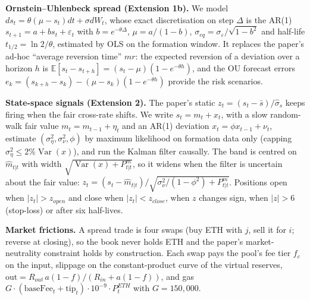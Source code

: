 \documentclass[10pt,a4paper]{article}
\begin{document}
\textbf{Ornstein--Uhlenbeck spread (Extension 1b).} We model $ds_t=\theta(\mu-s_t)dt+\sigma dW_t$, whose exact discretisation on step $\Delta$ is the AR(1) $s_{t+1}=a+bs_t+\varepsilon_t$ with $b=e^{-\theta\Delta}$, $\mu=a/(1-b)$, $\sigma_{eq}=\sigma_\varepsilon/\sqrt{1-b^2}$ and half-life $t_{1/2}=\ln 2/\theta$, estimated by OLS on the formation window. It replaces the paper's ad-hoc ``average reversion time'' $mr$: the expected reversion of a deviation over a horizon $h$ is $\mathbb{E}[s_t-s_{t+h}]=(s_t-\mu)(1-e^{-\theta h})$, and the OU forecast errors $e_k=(s_{k+h}-s_k)-(\mu-s_k)(1-e^{-\theta h})$ provide the risk scenarios.

\textbf{State-space signals (Extension 2).} The paper's static $z_t=(s_t-\bar s)/\hat\sigma_s$ keeps firing when the fair cross-rate shifts. We write $s_t=m_t+x_t$, with a slow random-walk fair value $m_t=m_{t-1}+\eta_t$ and an AR(1) deviation $x_t=\phi x_{t-1}+\nu_t$, estimate $(\sigma^2_\eta,\sigma^2_\nu,\phi)$ by maximum likelihood on formation data only (capping $\sigma^2_\eta\le 2\%\operatorname{Var}(x)$), and run the Kalman filter causally. The band is centred on $\hat m_{t|t}$ with width $\sqrt{\operatorname{Var}(x)+P^m_{t|t}}$, so it widens when the filter is uncertain about the fair value: $z_t=(s_t-\hat m_{t|t})/\sqrt{\sigma^2_\nu/(1-\phi^2)+P^m_{t|t}}$. Positions open when $|z_t|>z_{open}$ and close when $|z_t|<z_{close}$, when $z$ changes sign, when $|z|>6$ (stop-loss) or after six half-lives.

\textbf{Market frictions.} A spread trade is four swaps (buy ETH with $j$, sell it for $i$; reverse at closing), so the book never holds ETH and the paper's market-neutrality constraint holds by construction. Each swap pays the pool's fee tier $f_c$ on the input, slippage on the constant-product curve of the virtual reserves, $\text{out}=R_{out}\,a(1-f)/(R_{in}+a(1-f))$, and gas $G\cdot(\text{baseFee}_t+\text{tip}_t)\cdot10^{-9}\cdot P^{ETH}_t$ with $G=150{,}000$.
\end{document}
